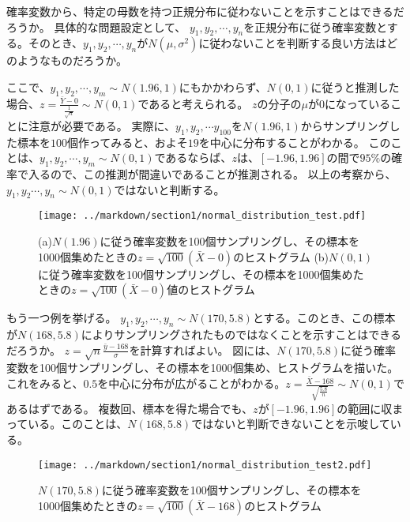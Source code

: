 \documentclass[a4paper,11pt,dvipdfmx]{jsarticle}
\begin{document}
確率変数から、特定の母数を持つ正規分布に従わないことを示すことはできるだろうか。
具体的な問題設定として、
$y_1,y_2,\cdots,y_n$を正規分布に従う確率変数とする。そのとき、$y_1,y_2,\cdots,y_n$が$N(\mu,\sigma^2)$に従わないことを判断する良い方法はどのようなものだろうか。

ここで、$y_1,y_2,\cdots,y_m \sim N(1.96,1)$にもかかわらず、$N(0,1)$に従うと推測した場合、$z=\frac{\bar{Y}-0}{\frac{1}{\sqrt{n}}} \sim N(0,1)$であると考えられる。
$z$の分子の$\mu$が$0$になっていることに注意が必要である。
実際に、$y_1,y_2,\cdots y_{100}$を$N(1.96,1)$からサンプリングした標本を$100$個作ってみると、およそ$19$を中心に分布することがわかる。
このことは、$y_1,y_2,\cdots,y_m\sim N(0,1)$であるならば、$z$は、$[-1.96,1.96]$の間で$95\%$の確率で入るので、この推測が間違いであることが推測される。
以上の考察から、$y_1,y_2\cdots,y_n\sim N(0,1)$ではないと判断する。

\begin{figure}
    \begin{center}
        \texttt{[image: ../markdown/section1/normal\_distribution\_test.pdf]}
        \caption{(a)$N(1.96)$に従う確率変数を100個サンプリングし、その標本を1000個集めたときの$z=\sqrt{100}(\bar{X}-0)$のヒストグラム (b)$N(0,1)$に従う確率変数を100個サンプリングし、その標本を1000個集めたときの$z=\sqrt{100}(\bar{X}-0)$値のヒストグラム}
    \end{center}
\end{figure}


もう一つ例を挙げる。
$y_1,y_2,\cdots,y_n \sim N(170,5.8)$とする。このとき、この標本が$N(168,5.8)$によりサンプリングされたものではなくことを示すことはできるだろうか。
$z=\sqrt{n}\frac{\bar{y}-168}{\sigma}$を計算すればよい。
図には、$N(170,5.8)$に従う確率変数を100個サンプリングし、その標本を1000個集め、ヒストグラムを描いた。
これをみると、$0.5$を中心に分布が広がることがわかる。$z=\frac{\bar{X}-168}{\sqrt{\frac{5.8}{n}}}\sim N(0,1)$であるはずである。
複数回、標本を得た場合でも、$z$が$[-1.96,1.96]$の範囲に収まっている。このことは、$N(168,5.8)$ではないと判断できないことを示唆している。


\begin{figure}
    \begin{center}
        \texttt{[image: ../markdown/section1/normal\_distribution\_test2.pdf]}
        \caption{$N(170,5.8)$に従う確率変数を100個サンプリングし、その標本を1000個集めたときの$z=\sqrt{100}(\bar{X}-168)$のヒストグラム}
    \end{center}
\end{figure}
\end{document}
